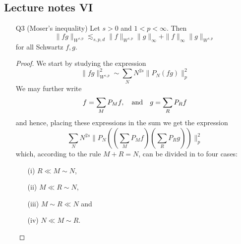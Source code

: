 \documentclass[11pt]{article}
\theoremstyle{remark}
\newcommand{\1}{\textbf{1}}
\newcommand{\lle}{\lesssim}
\def\norm#1{\| #1  \|}
\newcommand{\bbR}{\mathbb{R}}
\begin{document}
\subsection*{Lecture notes VI}
\begin{enumerate}
\item[Q3] (Moser's inequality) Let $s > 0$ and $1< p < \infty$. Then
\[
\norm{fg}_{W^{s,p}}\lle_{s,p,d}\norm{f}_{W^{s,p}}\norm{g}_{\infty} + \norm{f}_{\infty} \norm{g}_{W^{s,p}}
\]
for all Schwartz $f,g$.
\begin{proof}
We start by studying the expression
\[
\norm{fg}^2_{W^{s,p}} \sim \sum_N N^{2s} \norm{P_N(fg)}^2_p
\]
We may further write
\[
f = \sum_M P_M f, \quad \textup{and} \quad g = \sum_R P_R f
\]
and hence, placing these expressions in the sum we get the expression
\[
\sum_N N^{2s} \norm{P_N((\sum_M P_M f )(\sum_R P_R g))}^2_p
\]
which, according to the rule $M+R = N$, can be divided in to four cases:
\begin{enumerate}
\item[(i)] $R \ll M \sim N$,
\item[(ii)] $M \ll R \sim N$,
\item[(iii)] $M \sim R \ll N$ and
\item[(iv)] $N \ll M \sim R$.
\end{enumerate}

\end{proof}
\end{enumerate}
\end{document}
